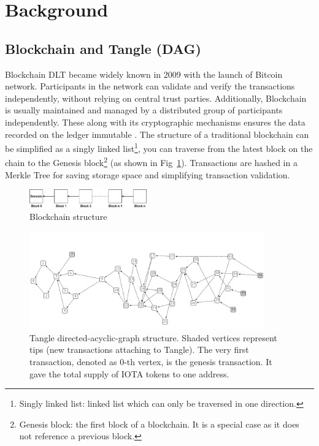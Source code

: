 \section{Background}
\label{sec:background}

\subsection{Blockchain and Tangle (DAG)}
Blockchain DLT became widely known in 2009 with the launch of Bitcoin network.
Participants in the network can validate and verify the transactions independently, without relying on central trust parties.
Additionally, Blockchain is usually maintained and managed by a distributed group of participants independently.
These along with its cryptographic mechanisms ensures the data recorded on the ledger immutable \cite{Yaga2018BlockchainTO}.
The structure of a traditional blockchain can be simplified as a singly linked list\footnote{Singly linked list: linked list which can only be traversed in one direction.},
you can traverse from the latest block on the chain to the Genesis block\footnote{Genesis block: the first block of a blockchain. It is a special case as it does not reference a previous block.} (as shown in Fig~\ref{fig:blockchain_structure}).
Transactions are hashed in a Merkle Tree \cite{merkle1980protocols} for saving storage space and simplifying transaction validation.


\begin{figure}[h]
    \includegraphics[width=0.45\textwidth,trim={-2cm -0.5cm 0 -0.5cm},clip]{figs/blockchain_structure.pdf}
    \caption{Blockchain structure}
    \label{fig:blockchain_structure}
\end{figure}

\begin{figure}[t]
    \centering
    \includegraphics[width=0.9\textwidth,trim={0 0 0 2cm},clip]{figs/tangle_structure.png}
    \caption{Tangle directed-acyclic-graph structure. Shaded vertices represent tips (new transactions attaching to Tangle). The very first transaction, denoted as 0-th vertex, is the genesis transaction. It gave the total supply of IOTA tokens to one address.}
    \label{fig:tangle_structure}
\end{figure}

